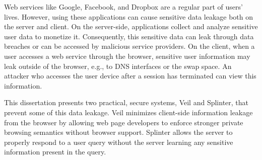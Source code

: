 Web services like Google, Facebook, and Dropbox 
are a regular part of users' lives. However,
using these applications can cause sensitive data
leakage both on the server and client.
On the server-side, applications collect and analyze
sensitive user data to monetize it. Consequently,
this sensitive data can leak through data breaches
or can be accessed by malicious service providers. 
On the client, when a user accesses a web service
through the browser, sensitive user information
may leak outside of the browser, 
e.g., to DNS interfaces or the swap space.
An attacker who accesses the user
device after a session has terminated can view
this information.

This dissertation presents two practical,
secure systems, Veil and Splinter, that
prevent some of this data leakage. Veil minimizes
client-side information leakage from the browser by allowing
web page developers to enforce stronger private browsing 
semantics without browser support. Splinter 
allows the server to properly respond to a user
query without the server learning any sensitive
information present in the query.
